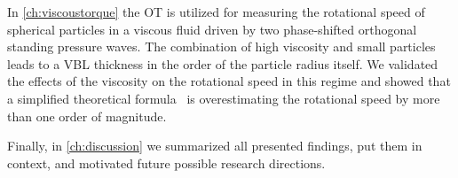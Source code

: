 In \cref{ch:viscoustorque} the OT is utilized for measuring the rotational 
speed of spherical particles in a viscous fluid driven by two phase-shifted 
orthogonal standing pressure waves. The combination of high viscosity and small 
particles leads to a VBL thickness in the order of the particle radius itself. 
We validated the effects of the viscosity on the rotational speed in this 
regime and showed that a simplified theoretical formula~\cite{Lamprecht2015} is 
overestimating the rotational speed by more than one order of magnitude.

Finally, in \cref{ch:discussion} we summarized all presented findings, put them 
in context, and motivated future possible research directions.
